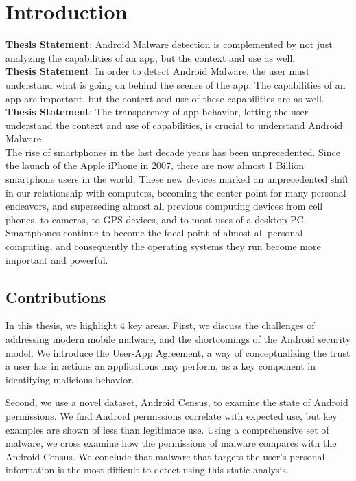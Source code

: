 \chapter{Introduction}
\label{sec:intro}

\textbf{Thesis Statement}: Android Malware detection is complemented by not just analyzing the capabilities of an app, but the context and use as well.\\
\textbf{Thesis Statement}: In order to detect Android Malware, the user must understand what is going on behind the scenes of the app. The capabilities of an app are important, but the context and use of these capabilities are as well.\\
\textbf{Thesis Statement}: The transparency of app behavior, letting the user understand the context and use of capabilities, is crucial to understand Android Malware\\


The rise of smartphones in the last decade years has been unprecedented. Since the launch of the Apple iPhone in 2007, there are now almost 1 Billion smartphone users in the world\citep{kpcbinternetreport2012}. These new devices marked an unprecedented shift in our relationship with computers, becoming the center point for many personal endeavors, and superseding almost all previous computing devices from cell phones, to cameras, to GPS devices, and to most uses of a desktop PC\citep{hua2012introduction}. Smartphones continue to become the focal point of almost all personal computing, and consequently the operating systems they run become more important and powerful.

\section{Contributions}
In this thesis, we highlight 4 key areas. First, we discuss the challenges of addressing modern mobile malware, and the shortcomings of the Android security model. We introduce the User-App Agreement, a way of conceptualizing the trust a user has in actions an applications may perform, as a key component in identifying malicious behavior.

Second, we use a novel dataset, Android Census, to examine the state of Android permissions. We find Android permissions correlate with expected use, but key examples are shown of less than legitimate use. Using a comprehensive set of malware, we cross examine how the permissions of malware compares with the Android Census. We conclude that malware that targets the user's personal information is the most difficult to detect using this static analysis.

